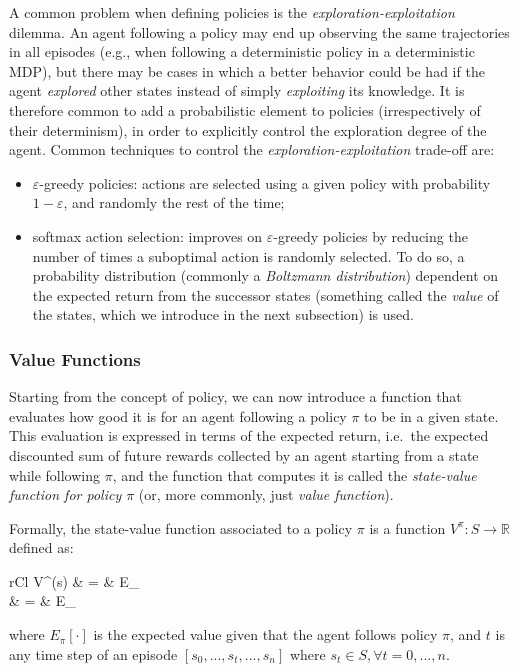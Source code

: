 A common problem when defining policies is the \textit{exploration-exploitation}
dilemma. An agent following a policy may end up observing the same trajectories 
in all episodes (e.g., when following a deterministic policy in a deterministic 
MDP), but there may be cases in which a better behavior could be had if the 
agent \textit{explored} other states instead of simply \textit{exploiting} its 
knowledge. 
It is therefore common to add a probabilistic element to policies 
(irrespectively of their determinism), in order to explicitly control the 
exploration degree of the agent. Common techniques to control the 
\textit{exploration-exploitation} trade-off are:
%
\begin{itemize}
    \item $\varepsilon$-greedy policies: actions are selected using a given 
    policy with probability $1-\varepsilon$, and randomly the rest of the time;
    \item softmax action selection: improves on $\varepsilon$-greedy policies by 
    reducing the number of times a suboptimal action is randomly selected. To do
    so, a probability distribution (commonly a \textit{Boltzmann distribution}) 
    dependent on the expected return from the successor states (something called
    the \textit{value} of the states, which we introduce in the next subsection)
    is used.
\end{itemize}
%
\subsubsection{Value Functions}
Starting from the concept of policy, we can now introduce a function that 
evaluates how good it is for an agent following a policy $\pi$ to be in a given 
state. This evaluation is expressed in terms of the expected return, i.e.\
the expected discounted sum of future rewards collected by an agent starting 
from a state while following $\pi$, and the function that computes it is 
called the \textit{state-value function for policy $\pi$} (or, more commonly, 
just \textit{value function}).

Formally, the state-value function associated to a policy $\pi$ is a function 
$V^{\pi}: S \rightarrow \mathbb{R}$ defined as:
%
\begin{IEEEeqnarray}{rCl}
    V^{\pi}(s) & = & E_\pi[R_t | s_t = s] \\
    & = & E_\pi[\sum\limits_{k = 0}^{\infty} \gamma^k r_{t+k+1} | s_t = s]
\end{IEEEeqnarray}
%
where $E_\pi[\cdot]$ is the expected value given that the agent follows 
policy $\pi$, and $t$ is any time step of an episode $[s_0, ..., s_t, ..., s_n]$
where $s_t \in S, \forall t = 0, ..., n$.

